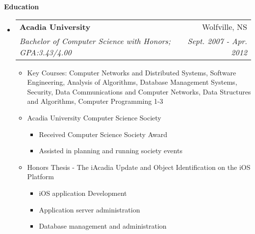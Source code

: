 \documentclass[letterpaper,11pt]{article}
\makeatletter
\newcommand{\resitem}[1]{\item #1 \vspace{-2pt}}
\newcommand{\resheading}[1]{{\large \colorbox{mygrey}{\begin{minipage}{\textwidth}{\textbf{#1 \vphantom{p\^{E}} }}\end{minipage}} }}
\newcommand{\ressubheading}[4]{
\begin{tabular*}{6.5in}{l@{\extracolsep{\fill}}r}
        \textbf{#1} & #2 \\
        \textit{#3} & \textit{#4} \\
\end{tabular*}\vspace{-6pt}}
\makeatother
\begin{document}
\begin{itemize}
\begin{comment}
                    between units and headquarters}
                    \resitem{Create and maintain paper documentation on every cadet to enter the unit}
                    \resitem{Teach classes to 12-18 year old youths}
                \end{itemize}
        \item[]
            \ressubheading{HMCS Acadia (DND)}{Cornwallis NS}{Boatswain Divisional Officer}{July - Aug. 2007-2009}
                \begin{itemize}
                    \resitem{Solely responsible for 25 cadets, ages 13-18 from 6:00am to 8:00pm}
                    \resitem{Documented training and performance in corps life in thorough reports for each individual cadet}
                    \resitem{Disciplined cadets to appropriate levels when required}
                    \resitem{Effectively communicated information within classes}
                    \resitem{Developed leadership skills of cadets}
                \end{itemize}
\end{comment}
    \end{itemize}  %

\resheading{Education} %
    \begin{itemize}
        \item[]
            \ressubheading{Acadia University}{Wolfville, NS}{{Bachelor of Computer Science with Honors}; {GPA:3.43/4.00}}{Sept. 2007 - Apr. 2012}
                \begin{itemize}
                    \resitem{Key Courses: Computer Networks and Distributed Systems, Software Engineering, Analysis of
                    Algorithms, Database Management Systems, Security, Data Communications and Computer Networks, Data
                    Structures and Algorithms, Computer Programming 1-3}
                    \resitem{Acadia University Computer Science Society}
                        \begin{itemize}
                            \resitem{Received Computer Science Society Award}
                            \resitem{Assisted in planning and running society events}
                        \end{itemize}
                    \resitem{Honors Thesis - The iAcadia Update and Object Identification on the iOS Platform}
                        \begin{itemize}
                            \resitem{iOS application Development}
                            \resitem{Application server administration}
                            \resitem{Database management and administration}
                        \end{itemize}
                \end{itemize}
    \end{itemize}
\end{document}
